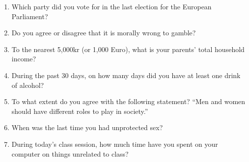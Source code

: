 \documentclass[a4, 12pt]{article}
\begin{document}
\begin{enumerate}
	\item Which party did you vote for in the last election for the European Parliament?
	
	\item Do you agree or disagree that it is morally wrong to gamble?
		
	\item To the nearest 5,000kr (or 1,000 Euro), what is your parents' total household income?
	
	\item During the past 30 days, on how many days did you have at least one drink of alcohol?
	
	\item To what extent do you agree with the following statement? ``Men and women should have different roles to play in society.''

	\item When was the last time you had unprotected sex?
	
	\item During today's class session, how much time have you spent on your computer on things unrelated to class?

\end{enumerate}
\end{document}
